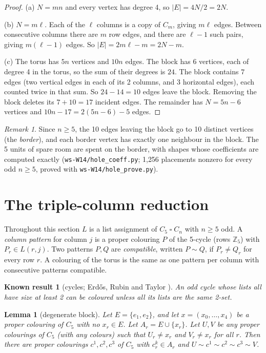 \documentclass[11pt]{article}
\theoremstyle{plain}
\newtheorem{lemma}[theorem]{Lemma}
\newtheorem{known}[theorem]{Known result}
\theoremstyle{definition}
\theoremstyle{remark}
\newtheorem{remark}[theorem]{Remark}
\newcommand{\T}{\mathbin{\square}}
\newcommand{\Z}{\mathbb{Z}}
\begin{document}
\begin{proof}
(a) $N = mn$ and every vertex has degree 4, so $|E| = 4N/2 = 2N$.

(b) $N = m\ell$. Each of the $\ell$ columns is a copy of $C_m$, giving $m\ell$ edges. Between consecutive columns
there are $m$ row edges, and there are $\ell - 1$ such pairs, giving $m(\ell - 1)$ edges. So
$|E| = 2m\ell - m = 2N - m$.

(c) The torus has $5n$ vertices and $10n$ edges. The block has 6 vertices, each of degree 4 in the torus, so
the sum of their degrees is $24$. The block contains $7$ edges (two vertical edges in each of its 2 columns,
and 3 horizontal edges), each counted twice in that sum. So $24 - 14 = 10$ edges leave the block. Removing
the block deletes its $7 + 10 = 17$ incident edges. The remainder has $N = 5n - 6$ vertices and
$10n - 17 = 2(5n - 6) - 5$ edges.
\end{proof}

\begin{remark}
Since $n \ge 5$, the 10 edges leaving the block go to 10 distinct vertices (the \emph{border}), and each border
vertex has exactly one neighbour in the block. The 5 units of spare room are spent on the border, with
shapes whose coefficients are computed exactly (\texttt{ws-W14/hole\_coeff.py}; 1{,}256 placements nonzero for
every odd $n \ge 5$, proved with \texttt{ws-W14/hole\_prove.py}).
\end{remark}

\section{The triple-column reduction}

Throughout this section $L$ is a list assignment of $C_5 \T C_n$ with $n \ge 5$ odd. A \emph{column pattern}
for column $j$ is a proper colouring $P$ of the 5-cycle (rows $\Z_5$) with $P_r \in L(r, j)$. Two patterns $P, Q$
are \emph{compatible}, written $P \sim Q$, if $P_r \ne Q_r$ for every row $r$. A colouring of the torus is the
same as one pattern per column with consecutive patterns compatible.

\begin{known}[cycles; Erd\H{o}s, Rubin and Taylor \cite{ERT}]\label{cyc}
An odd cycle whose lists all have size at least 2 can be coloured unless all its lists are the same 2-set.
\end{known}

\begin{lemma}[degenerate block]\label{degen}
Let $E = \{e_1, e_2\}$, and let $x = (x_0, \dots, x_4)$ be a proper colouring of $C_5$ with no $x_r \in E$. Let
$A_r = E \cup \{x_r\}$. Let $U, V$ be any proper colourings of $C_5$ (with any colours) such that $U_r \ne x_r$
and $V_r \ne x_r$ for all $r$. Then there are proper colourings $c^1, c^2, c^3$ of $C_5$ with $c^k_r \in A_r$ and
$U \sim c^1 \sim c^2 \sim c^3 \sim V$.
\end{lemma}
\end{document}
